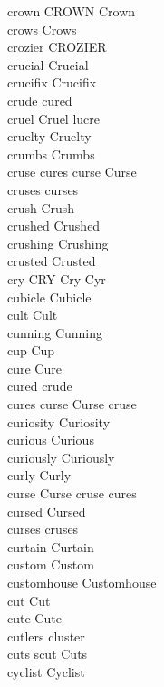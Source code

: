 crown CROWN Crown\\
crows Crows\\
crozier CROZIER\\
crucial Crucial\\
crucifix Crucifix\\
crude cured\\
cruel Cruel lucre\\
cruelty Cruelty\\
crumbs Crumbs\\
cruse cures curse Curse\\
cruses curses\\
crush Crush\\
crushed Crushed\\
crushing Crushing\\
crusted Crusted\\
cry CRY Cry Cyr\\
cubicle Cubicle\\
cult Cult\\
cunning Cunning\\
cup Cup\\
cure Cure\\
cured crude\\
cures curse Curse cruse\\
curiosity Curiosity\\
curious Curious\\
curiously Curiously\\
curly Curly\\
curse Curse cruse cures\\
cursed Cursed\\
curses cruses\\
curtain Curtain\\
custom Custom\\
customhouse Customhouse\\
cut Cut\\
cute Cute\\
cutlers cluster\\
cuts scut Cuts\\
cyclist Cyclist\\

